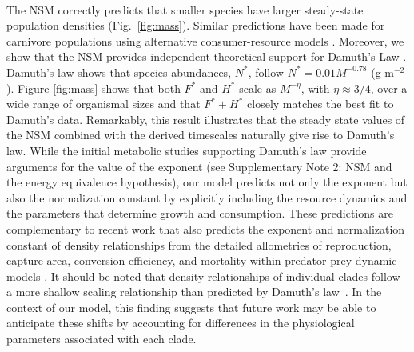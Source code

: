 \documentclass[twocolumn,preprintnumbers,amsmath,amssymb,superscriptaddress]{revtex4}
\begin{document}
\\ 
The NSM
correctly predicts that smaller species have larger steady-state population
densities (Fig.~\ref{fig:mass}).  Similar predictions have been made for
carnivore populations using alternative consumer-resource models
\citep{DeLong:2012kw}.  Moreover, we show that the NSM provides independent
theoretical support for Damuth's Law
\citep{Damuth:1987kr,allen2002,enquist1998,Pedersen:2017he}.  Damuth's
law shows that species abundances, $N^{*}$, follow $N^*=0.01
M^{-0.78}$ (g m$^{-2}$). Figure \ref{fig:mass} shows that both $F^{*}$ and $H^{*}$ scale
as $M^{-\eta}$, with $\eta\approx 3/4$,  over a wide range of organismal sizes and that $F^{*}+H^{*}$
closely matches the best fit to Damuth's data.  Remarkably, this result
illustrates that the steady state values of the NSM combined with the derived
timescales naturally give rise to Damuth's law. 
While the initial metabolic studies supporting Damuth's law provide arguments for the value of the exponent \citep{Damuth:1987kr,allen2002} (see Supplementary Note 2: NSM and the energy equivalence hypothesis), our model predicts not only the exponent but also the normalization constant by explicitly including the resource dynamics and the parameters that determine growth and consumption. 
These predictions are complementary to recent work that also predicts the exponent and normalization constant of density relationships from the detailed allometries of reproduction, capture area, conversion efficiency, and mortality within predator-prey dynamic models \citep{DeLong:2012kw,DeLong:2012fj}.
It should be noted that density relationships of
individual clades follow a more shallow scaling relationship than predicted
by Damuth's law~\citep{Pedersen:2017he}.  In the context of our model,
this finding suggests that future work may be able to anticipate these shifts
by accounting for differences in the physiological parameters associated with
each clade.
\end{document}
